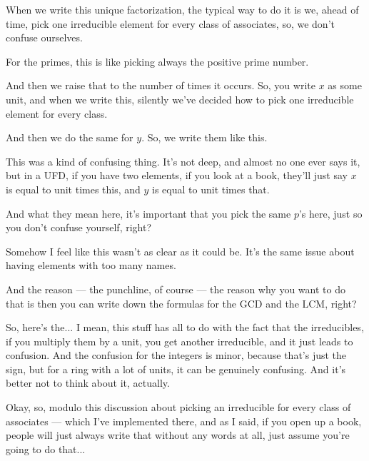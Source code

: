 \begin{speech}[01:21:45 - 01:23:55]

When we write this unique factorization, the typical way to do it is we, ahead of time, pick one irreducible element for every class of associates, so, we don't confuse ourselves.

For the primes, this is like picking always the positive prime number.

And then we raise that to the number of times it occurs. So, you write $x$ as some unit, and when we write this, silently we've decided how to pick one irreducible element for every class.

And then we do the same for $y$. So, we write them like this.

This was a kind of confusing thing. It's not deep, and almost no one ever says it, but in a UFD, if you have two elements, if you look at a book, they'll just say $x$ is equal to unit times this, and $y$ is equal to unit times that.

And what they mean here, it's important that you pick the same $p$'s here, just so you don't confuse yourself, right?

Somehow I feel like this wasn't as clear as it could be. It's the same issue about having elements with too many names.

And the reason --- the punchline, of course --- the reason why you want to do that is then you can write down the formulas for the GCD and the LCM, right?

So, here's the... I mean, this stuff has all to do with the fact that the irreducibles, if you multiply them by a unit, you get another irreducible, and it just leads to confusion. And the confusion for the integers is minor, because that's just the sign, but for a ring with a lot of units, it can be genuinely confusing. And it's better not to think about it, actually.

Okay, so, modulo this discussion about picking an irreducible for every class of associates --- which I've implemented there, and as I said, if you open up a book, people will just always write that without any words at all, just assume you're going to do that... 
\end{speech}

